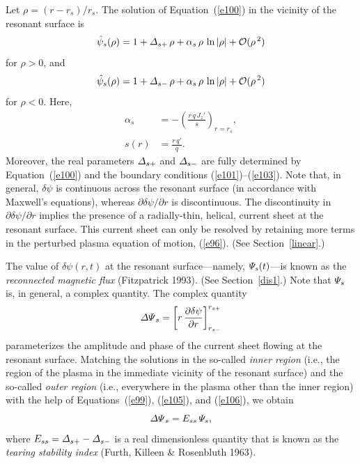 \documentclass[notitlepage,12pt]{article}
\begin{document}
Let $\rho=(r-r_s)/r_s$. 
The solution of Equation~(\ref{e100}) in the vicinity of the resonant surface is
\begin{equation}\label{e105}
\hat{\psi}_s(\rho) = 1 + {\mit\Delta}_{s+}\,\rho + \alpha_s\,\rho\,\ln|\rho| + {\cal O}(\rho^{\,2})
\end{equation}
for $\rho>0$, and
\begin{equation}\label{e106}
\hat{\psi}_s(\rho) = 1 + {\mit\Delta}_{s-}\,\rho + \alpha_s\,\rho\,\ln|\rho| + {\cal O}(\rho^{\,2})
\end{equation}
for $\rho<0$. Here, 
\begin{align}\label{e108}
\alpha_s& =- \left(\frac{r\,q\,J_z'}{s}\right)_{r=r_s},\\[0.5ex]
s(r) &= \frac{r\,q'}{q}.\label{shear}
\end{align}
Moreover,  the real parameters ${\mit\Delta}_{s+}$ and  ${\mit\Delta}_{s-}$ are fully determined by Equation~(\ref{e100})
and the boundary conditions (\ref{e101})--(\ref{e103}). Note that, in general, $\delta\psi$ is continuous across the resonant surface (in accordance with Maxwell's equations),
whereas $\partial\delta\psi/\partial r$ is discontinuous. The discontinuity in $\partial \delta\psi/\partial r$ implies the presence of a radially-thin, helical,  current sheet  at the resonant surface. This current sheet can only be resolved by retaining more terms in the perturbed plasma equation of motion, (\ref{e96}). (See Section~\ref{linear}.) 

The value of $\delta\psi(r,t)$ at the resonant surface---namely, ${\mit\Psi}_s(t)$---is known as the {\em reconnected magnetic flux}\/ (Fitzpatrick 1993). (See Section~\ref{dis1}.)
Note that ${\mit\Psi}_s$ is, in general, a complex quantity. 
The complex quantity
\begin{equation}\label{e109}
{\mit\Delta\Psi}_s = \left[r\,\frac{\partial \delta\psi}{\partial r}\right]_{r_{s-}}^{r_{s+}}
\end{equation}
parameterizes the amplitude and phase of the current sheet flowing at the resonant surface. Matching the solutions
in the so-called {\em inner region}\/ (i.e., the region of the plasma in the immediate vicinity of the resonant surface)
and the so-called {\em outer region}\/ (i.e., everywhere in the plasma other than the inner region) with the help
of Equations~(\ref{e99}), (\ref{e105}), and (\ref{e106}), we obtain
\begin{equation}\label{e110}
{\mit\Delta\Psi}_s = E_{ss}\,{\mit\Psi}_s,
\end{equation}
where $E_{ss}= {\mit\Delta}_{s+}-{\mit\Delta}_{s-}$ is a real dimensionless quantity that is known as the {\em tearing stability index}\/ (Furth, Killeen \& Rosenbluth 1963). 
\end{document}
